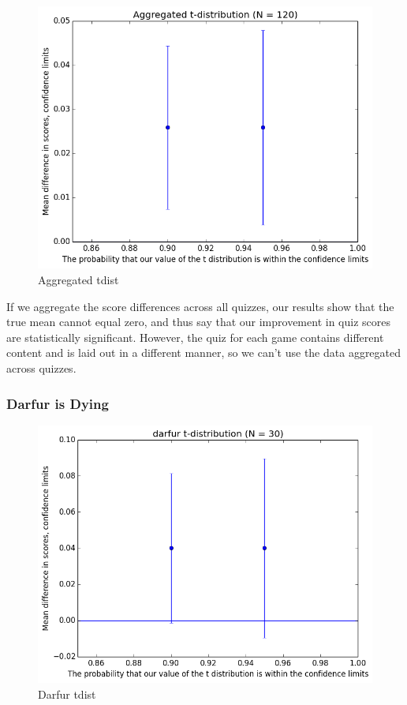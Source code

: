 				\begin{figure}[] 
					\centering 
					\includegraphics[width=\textwidth, height=.4\textheight, keepaspectratio=true]{aggregated_tdist.png} 
					\caption{Aggregated tdist}
				\end{figure}

				If we aggregate the score differences across all quizzes, our results show that the true mean cannot equal zero, and thus say that our improvement in quiz scores are statistically significant. However, the quiz for each game contains different content and is laid out in a different manner, so we can't use the data aggregated across quizzes.

			\subsubsection{Darfur is Dying}

				\begin{figure}[] 
					\centering 
					\includegraphics[width=\textwidth, height=.4\textheight, keepaspectratio=true]{darfur_tdist.png} 
					\caption{Darfur tdist}
				\end{figure}

